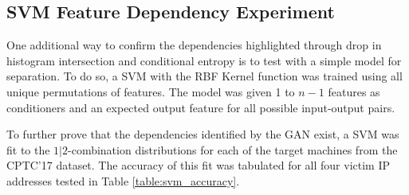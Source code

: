 %
%
%





\printglossary[type=main]

\begin{appendices}
	
	\chapter{SVM Feature Dependency Experiment}
	\label{sec:svm_app}
	
	
	One additional way to confirm the dependencies highlighted through drop in histogram intersection and conditional entropy is to test with a simple model for separation. To do so, a SVM with the RBF Kernel function was trained using all unique permutations of features. The model was given 1 to $n-1$ features as conditioners and an expected output feature for all possible input-output pairs. 
	
	To further prove that the dependencies identified by the GAN exist, a SVM was fit to the $1|2$-combination distributions for each of the target machines from the CPTC'17 dataset. The accuracy of this fit was tabulated for all four victim IP addresses tested in Table \ref{table:svm_accuracy}.
	

\end{appendices}
